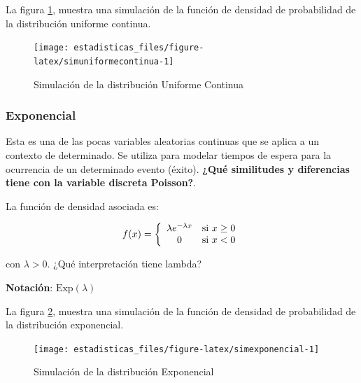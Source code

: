 \documentclass[
  11pt,
]{book}
\theoremstyle{definition}
\theoremstyle{definition}
\theoremstyle{definition}
\theoremstyle{definition}
\theoremstyle{remark}
\begin{document}
La figura \ref{fig:simuniformecontinua}, muestra una simulación de la función de densidad de probabilidad de la distribución uniforme continua.

\begin{figure}

{\centering \texttt{[image: estadisticas\_files/figure-latex/simuniformecontinua-1]} 

}

\caption{Simulación de la distribución Uniforme Continua}\label{fig:simuniformecontinua}
\end{figure}

\subsubsection{Exponencial}\label{exponencial}

Esta es una de las pocas variables aleatorias continuas que se aplica a un contexto de determinado. Se utiliza para modelar tiempos de espera para la ocurrencia de un determinado evento (éxito). \textbf{¿Qué similitudes y diferencias tiene con la variable discreta Poisson?}.

La función de densidad asociada es:

\begin{equation}
\notag
f(x)= \left\lbrace
\begin{array}{cl}
\lambda e^{ -\lambda x} & \text{si } x \geq 0\\
0 & \text{si } x < 0
\end{array}
\right.
\end{equation}

con \(\lambda > 0\). ¿Qué interpretación tiene lambda?

\textbf{Notación}: \(\text{Exp}(\lambda)\)

La figura \ref{fig:simexponencial}, muestra una simulación de la función de densidad de probabilidad de la distribución exponencial.

\begin{figure}

{\centering \texttt{[image: estadisticas\_files/figure-latex/simexponencial-1]} 

}

\caption{Simulación de la distribución Exponencial}\label{fig:simexponencial}
\end{figure}
\end{document}
